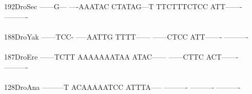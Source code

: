 \documentclass[11pt,twoside,reqno,a4paper]{article}
\begin{document}
{192\hspace*{2\charwidth}DroSec	------G---	----AAATAC	CTATAG---T	TTCTTTCTCC	ATT-------	----------	\\
\hspace*{5\charwidth}\hspace*{7\charwidth}\hspace*{1\charwidth}\hspace*{1\charwidth}\hspace*{1\charwidth}\hspace*{1\charwidth}\hspace*{1\charwidth}\hspace*{1\charwidth}\\
188\hspace*{2\charwidth}DroYak	------TCC-	-----AATTG	TTTT------	------CTCC	ATT-------	----------	\\
\hspace*{5\charwidth}\hspace*{7\charwidth}\hspace*{1\charwidth}\hspace*{1\charwidth}\hspace*{1\charwidth}\hspace*{1\charwidth}\hspace*{1\charwidth}\hspace*{1\charwidth}\\
187\hspace*{2\charwidth}DroEre	------TCTT	AAAAAAATAA	ATAC------	------CTTC	ACT-------	----------	\\
\hspace*{5\charwidth}\hspace*{7\charwidth}\hspace*{1\charwidth}\hspace*{1\charwidth}\hspace*{1\charwidth}\hspace*{1\charwidth}\hspace*{1\charwidth}\hspace*{1\charwidth}\\
128\hspace*{2\charwidth}DroAna	---------T	ACAAAAATCC	ATTTA-----	----------	----------	----------	\\
\hspace*{5\charwidth}\hspace*{7\charwidth}\hspace*{1\charwidth}\hspace*{1\charwidth}\hspace*{1\charwidth}\hspace*{1\charwidth}\hspace*{1\charwidth}\hspace*{1\charwidth}\\
}
\end{document}
